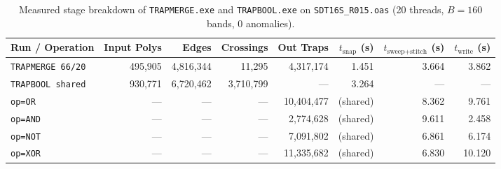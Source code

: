 \begin{table}[htbp]
\centering
\caption{Measured stage breakdown of \texttt{TRAPMERGE.exe} and \texttt{TRAPBOOL.exe} on \texttt{SDT16S\_R015.oas} (20 threads, $B=160$ bands, 0 anomalies).}
\label{tab:merge_bool_perf}
\small
\begin{tabular}{@{}lrrrrrrr@{}}
\toprule
\textbf{Run / Operation} & \textbf{Input Polys} & \textbf{Edges} & \textbf{Crossings} & \textbf{Out Traps} & \textbf{$t_{\text{snap}}$ (s)} & \textbf{$t_{\text{sweep+stitch}}$ (s)} & \textbf{$t_{\text{write}}$ (s)} \\
\midrule
\texttt{TRAPMERGE 66/20} & 495,905 & 4,816,344 & 11,295 & 4,317,174 & 1.451 & 3.664 & 3.862 \\
\midrule
\texttt{TRAPBOOL shared} & 930,771 & 6,720,462 & 3,710,799 & --- & 3.264 & --- & --- \\
\quad \texttt{op=OR} & --- & --- & --- & 10,404,477 & (shared) & 8.362 & 9.761 \\
\quad \texttt{op=AND} & --- & --- & --- & 2,774,628 & (shared) & 9.611 & 2.458 \\
\quad \texttt{op=NOT} & --- & --- & --- & 7,091,802 & (shared) & 6.861 & 6.174 \\
\quad \texttt{op=XOR} & --- & --- & --- & 11,335,682 & (shared) & 6.830 & 10.120 \\
\bottomrule
\end{tabular}
\end{table}
